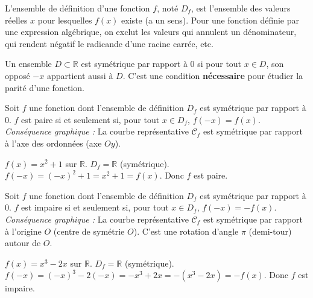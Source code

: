 \documentclass[11pt]{article}
\newcommand{\cle}[1]{{\popxbold\color{popdark}#1}}
\newcounter{popsec}
\newcounter{popsub}
\newcommand{\courssub}[1]{%
  \stepcounter{popsub}%
  \par\vspace{9pt}\noindent{\popxbold\fontsize{11.5}{13}\selectfont\color{popink}{\color{poporange}\thepopsec.\thepopsub}\hspace{6pt}#1}\par\nopagebreak\vspace{4pt}
}
\begin{document}
\begin{definition}
L'\cle{ensemble de définition} d'une fonction $f$, noté $D_f$, est l'ensemble des valeurs réelles $x$ pour lesquelles $f(x)$ existe (a un sens). Pour une fonction définie par une expression algébrique, on exclut les valeurs qui annulent un dénominateur, qui rendent négatif le radicande d'une racine carrée, etc.
\end{definition}

\begin{propriete}
Un ensemble $D \subset \mathbb{R}$ est \cle{symétrique par rapport à $0$} si pour tout $x \in D$, son opposé $-x$ appartient aussi à $D$. C'est une condition \textbf{nécessaire} pour étudier la parité d'une fonction.
\end{propriete}

\begin{propriete}
Soit $f$ une fonction dont l'ensemble de définition $D_f$ est symétrique par rapport à $0$.
$f$ est \cle{paire} si et seulement si, pour tout $x \in D_f$, $f(-x) = f(x)$.
\emph{Conséquence graphique :} La courbe représentative $\mathcal{C}_f$ est symétrique par rapport à \cle{l'axe des ordonnées} (axe $Oy$).
\end{propriete}

\begin{exemplebox}
$f(x) = x^2 + 1$ sur $\mathbb{R}$. $D_f = \mathbb{R}$ (symétrique). $f(-x) = (-x)^2 + 1 = x^2 + 1 = f(x)$. Donc $f$ est paire.
\end{exemplebox}

\courssub{Fonctions impaires}

\begin{propriete}
Soit $f$ une fonction dont l'ensemble de définition $D_f$ est symétrique par rapport à $0$.
$f$ est \cle{impaire} si et seulement si, pour tout $x \in D_f$, $f(-x) = -f(x)$.
\emph{Conséquence graphique :} La courbe représentative $\mathcal{C}_f$ est symétrique par rapport à \cle{l'origine} $O$ (centre de symétrie $O$). C'est une rotation d'angle $\pi$ (demi-tour) autour de $O$.
\end{propriete}

\begin{exemplebox}
$f(x) = x^3 - 2x$ sur $\mathbb{R}$. $D_f = \mathbb{R}$ (symétrique). $f(-x) = (-x)^3 - 2(-x) = -x^3 + 2x = -(x^3 - 2x) = -f(x)$. Donc $f$ est impaire.
\end{exemplebox}
\end{document}
